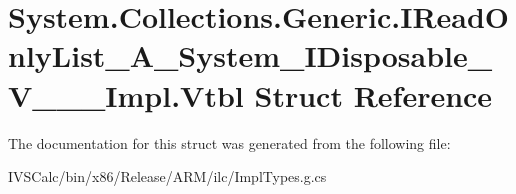 \hypertarget{struct_system_1_1_collections_1_1_generic_1_1_i_read_only_list___a___system___i_disposable___v_______impl_1_1_vtbl}{}\section{System.\+Collections.\+Generic.\+I\+Read\+Only\+List\+\_\+\+A\+\_\+\+System\+\_\+\+I\+Disposable\+\_\+\+V\+\_\+\+\_\+\+\_\+\+Impl.\+Vtbl Struct Reference}
\label{struct_system_1_1_collections_1_1_generic_1_1_i_read_only_list___a___system___i_disposable___v_______impl_1_1_vtbl}


The documentation for this struct was generated from the following file\+:\begin{DoxyCompactItemize}
\item 
I\+V\+S\+Calc/bin/x86/\+Release/\+A\+R\+M/ilc/Impl\+Types.\+g.\+cs\end{DoxyCompactItemize}
